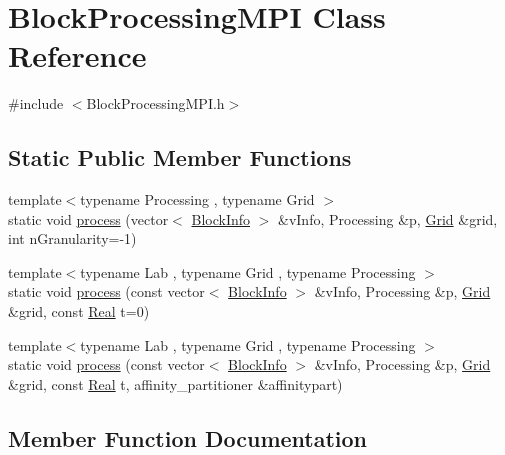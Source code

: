 \hypertarget{class_block_processing_m_p_i}{}\section{Block\+Processing\+M\+P\+I Class Reference}
\label{class_block_processing_m_p_i}


{\ttfamily \#include $<$Block\+Processing\+M\+P\+I.\+h$>$}

\subsection*{Static Public Member Functions}
\begin{DoxyCompactItemize}
\item 
{\footnotesize template$<$typename Processing , typename Grid $>$ }\\static void \hyperlink{class_block_processing_m_p_i_afdddfef263bdd3f2e5519b701b5299be}{process} (vector$<$ \hyperlink{struct_block_info}{Block\+Info} $>$ \&v\+Info, Processing \&p, \hyperlink{class_grid}{Grid} \&grid, int n\+Granularity=-\/1)
\item 
{\footnotesize template$<$typename Lab , typename Grid , typename Processing $>$ }\\static void \hyperlink{class_block_processing_m_p_i_ad22d78cc5cc53d5e4c05e33ca5ca9c0d}{process} (const vector$<$ \hyperlink{struct_block_info}{Block\+Info} $>$ \&v\+Info, Processing \&p, \hyperlink{class_grid}{Grid} \&grid, const \hyperlink{_h_d_f5_dumper_8h_a445a5f0e2a34c9d97d69a3c2d1957907}{Real} t=0)
\item 
{\footnotesize template$<$typename Lab , typename Grid , typename Processing $>$ }\\static void \hyperlink{class_block_processing_m_p_i_a8b5997288907f3237a965ee7428b8001}{process} (const vector$<$ \hyperlink{struct_block_info}{Block\+Info} $>$ \&v\+Info, Processing \&p, \hyperlink{class_grid}{Grid} \&grid, const \hyperlink{_h_d_f5_dumper_8h_a445a5f0e2a34c9d97d69a3c2d1957907}{Real} t, affinity\+\_\+partitioner \&affinitypart)
\end{DoxyCompactItemize}


\subsection{Member Function Documentation}
\hypertarget{class_block_processing_m_p_i_afdddfef263bdd3f2e5519b701b5299be}{}
